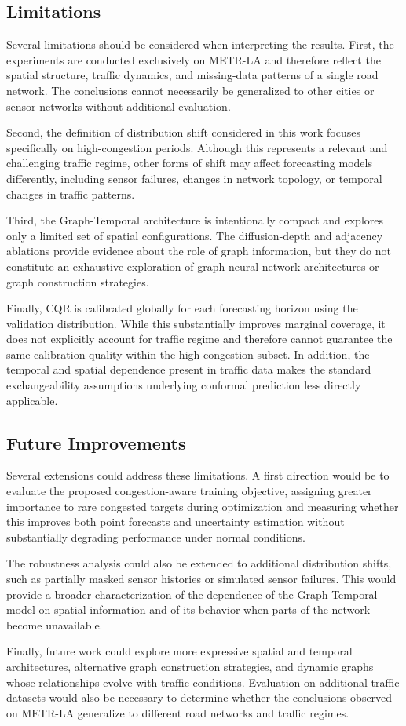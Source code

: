 \subsection{Limitations}
\label{subsec:limitations}

Several limitations should be considered when interpreting the results.
First, the experiments are conducted exclusively on METR-LA and therefore
reflect the spatial structure, traffic dynamics, and missing-data patterns of
a single road network. The conclusions cannot necessarily be generalized to
other cities or sensor networks without additional evaluation.

Second, the definition of distribution shift considered in this work focuses
specifically on high-congestion periods. Although this represents a relevant
and challenging traffic regime, other forms of shift may affect forecasting
models differently, including sensor failures, changes in network topology,
or temporal changes in traffic patterns.

Third, the Graph-Temporal architecture is intentionally compact and explores
only a limited set of spatial configurations. The diffusion-depth and
adjacency ablations provide evidence about the role of graph information, but
they do not constitute an exhaustive exploration of graph neural network
architectures or graph construction strategies.

Finally, CQR is calibrated globally for each forecasting horizon using the
validation distribution. While this substantially improves marginal
coverage, it does not explicitly account for traffic regime and therefore
cannot guarantee the same calibration quality within the high-congestion
subset. In addition, the temporal and spatial dependence present in traffic
data makes the standard exchangeability assumptions underlying conformal
prediction less directly applicable.


\subsection{Future Improvements}
\label{subsec:future_improvements}

Several extensions could address these limitations. A first direction would
be to evaluate the proposed congestion-aware training objective, assigning
greater importance to rare congested targets during optimization and
measuring whether this improves both point forecasts and uncertainty
estimation without substantially degrading performance under normal
conditions.

The robustness analysis could also be extended to additional distribution
shifts, such as partially masked sensor histories or simulated sensor
failures. This would provide a broader characterization of the dependence of
the Graph-Temporal model on spatial information and of its behavior when
parts of the network become unavailable.

Finally, future work could explore more expressive spatial and temporal
architectures, alternative graph construction strategies, and dynamic graphs
whose relationships evolve with traffic conditions. Evaluation on additional
traffic datasets would also be necessary to determine whether the conclusions
observed on METR-LA generalize to different road networks and traffic
regimes.